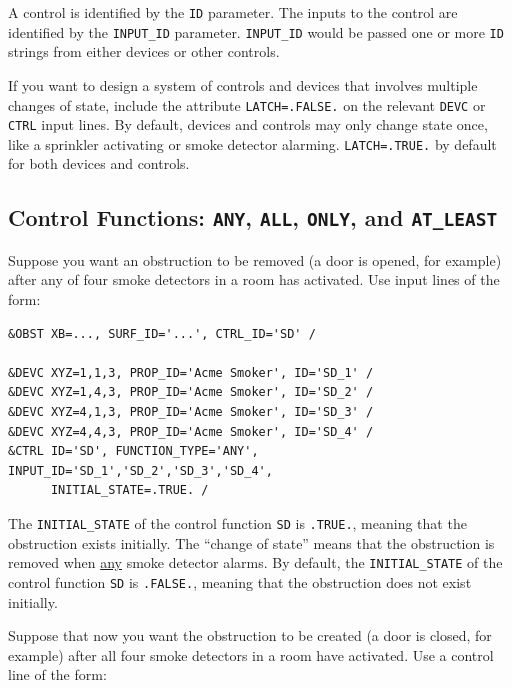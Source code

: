 \documentclass[11pt]{book}
\newcommand{\ct}{\tt\small}
\begin{document}
A control is identified by the {\ct ID} parameter.  The inputs to the control are identified
by the {\ct INPUT\_ID} parameter.  {\ct INPUT\_ID} would be passed one or more {\ct ID} strings
from either devices or other controls.


If you want to design a system of controls and devices that involves multiple changes of state,
include the attribute {\ct LATCH=.FALSE.} on the relevant {\ct DEVC} or {\ct CTRL} input lines.
By default, devices and controls may only change state once, like a sprinkler activating or
smoke detector alarming. {\ct LATCH=.TRUE.} by default for both devices and controls.

\subsection{Control Functions: \texorpdfstring{{\tt ANY}}{ANY}, \texorpdfstring{{\tt ALL}}{ALL}, \texorpdfstring{{\tt ONLY}}{ONLY}, and
\texorpdfstring{{\tt AT\_LEAST}}{AT\_LEAST}}

Suppose you want an obstruction to be removed (a door is opened, for example) after any
of four smoke detectors in a room has activated. Use input lines of the form:

\footnotesize
\begin{verbatim}
&OBST XB=..., SURF_ID='...', CTRL_ID='SD' /

&DEVC XYZ=1,1,3, PROP_ID='Acme Smoker', ID='SD_1' /
&DEVC XYZ=1,4,3, PROP_ID='Acme Smoker', ID='SD_2' /
&DEVC XYZ=4,1,3, PROP_ID='Acme Smoker', ID='SD_3' /
&DEVC XYZ=4,4,3, PROP_ID='Acme Smoker', ID='SD_4' /
&CTRL ID='SD', FUNCTION_TYPE='ANY', INPUT_ID='SD_1','SD_2','SD_3','SD_4',
      INITIAL_STATE=.TRUE. /
\end{verbatim}
\normalsize

\noindent
The {\ct INITIAL\_STATE} of the control function {\ct SD} is {\ct .TRUE.},
meaning that the obstruction exists initially. The ``change of state'' means that the obstruction is
removed when \underline{any}  smoke detector alarms.  By default, the {\ct INITIAL\_STATE}
of the control function {\ct SD} is {\ct .FALSE.}, meaning that the obstruction does not exist initially.

Suppose that now you want the obstruction to be created (a door is closed, for example) after all 
four smoke detectors in a room have activated. Use a control line of the form:
\end{document}

